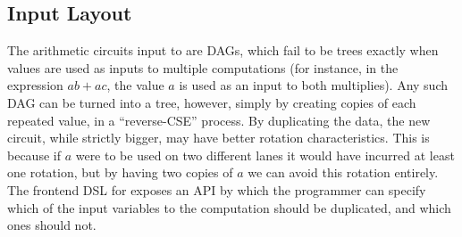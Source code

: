 
\subsection{Input Layout}\label{sec:duplicating-inputs}
The arithmetic circuits input to \system are DAGs, which fail to be trees exactly when values are used as inputs to multiple computations (for instance, in the expression $ab + ac$, the value $a$ is used as an input to both multiplies).
Any such DAG can be turned into a tree, however, simply by creating copies of each repeated value, in a ``reverse-CSE'' process.
By duplicating the data, the new circuit, while strictly bigger, may have better rotation characteristics.
This is because if $a$ were to be used on two different lanes it would have incurred at least one rotation, but by having two copies of $a$ we can avoid this rotation entirely. The frontend DSL for \system exposes an API by which the programmer can specify which of the input variables to the computation should be duplicated, and which ones should not.

